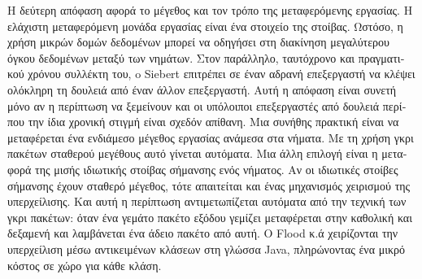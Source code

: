 \begin{greek}
Η δεύτερη απόφαση αφορά το μέγεθος και τον τρόπο της μεταφερόμενης
εργασίας. Η ελάχιστη μεταφερόμενη μονάδα εργασίας είναι ένα
στοιχείο της στοίβας. Ωστόσο, η χρήση μικρών δομών δεδομένων
μπορεί να οδηγήσει στη διακίνηση μεγαλύτερου όγκου δεδομένων
μεταξύ των νημάτων. Στον παράλληλο, ταυτόχρονο και πραγματικού
χρόνου συλλέκτη του, o Siebert \cite{DBLP:conf/iwmm/Siebert10}
επιτρέπει σε έναν αδρανή επεξεργαστή να κλέψει ολόκληρη τη
δουλειά από έναν άλλον επεξεργαστή. Αυτή η απόφαση είναι συνετή
μόνο αν η περίπτωση να ξεμείνουν και οι υπόλοιποι επεξεργαστές
από δουλειά περίπου την ίδια χρονική στιγμή είναι σχεδόν
απίθανη. Μια συνήθης πρακτική είναι να μεταφέρεται ένα ενδιάμεσο
μέγεθος εργασίας ανάμεσα στα νήματα. Με τη χρήση γκρι πακέτων
σταθερού μεγέθους αυτό γίνεται αυτόματα. Μια άλλη επιλογή
είναι η μεταφορά της μισής ιδιωτικής στοίβας σήμανσης ενός
νήματος. Αν οι ιδιωτικές στοίβες σήμανσης έχουν σταθερό
μέγεθος, τότε απαιτείται και ένας μηχανισμός χειρισμού της
υπερχείλισης. Και αυτή η περίπτωση αντιμετωπίζεται αυτόματα
από την τεχνική των γκρι πακέτων: όταν ένα γεμάτο πακέτο
εξόδου γεμίζει μεταφέρεται στην καθολική και δεξαμενή και
λαμβάνεται ένα άδειο πακέτο από αυτή. Ο Flood κ.ά 
\cite{DBLP:conf/jvm/FloodDSZ01} χειρίζονται την υπερχείλιση
μέσω αντικειμένων κλάσεων στη γλώσσα Java, πληρώνοντας ένα
μικρό κόστος σε χώρο για κάθε κλάση.


\end{greek}
